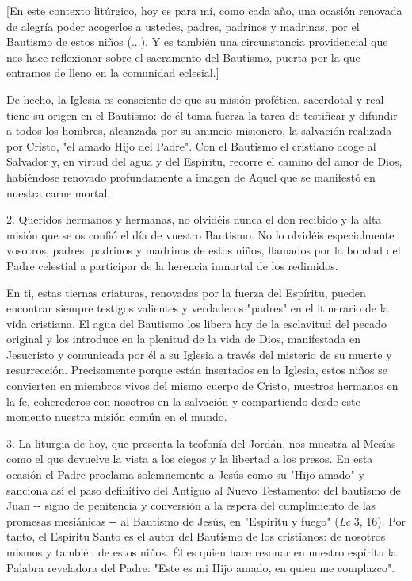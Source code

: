 \begin{body}
{[}En este contexto litúrgico, hoy es para mí, como cada año, una ocasión renovada de alegría poder acogerlos a ustedes, padres, padrinos y madrinas, por el Bautismo de estos niños (...). Y es también una circunstancia providencial que nos hace reflexionar sobre el sacramento del Bautismo, puerta por la que entramos de lleno en la comunidad eclesial.{]}

De hecho, la Iglesia es consciente de que su misión profética, sacerdotal y real tiene su origen en el Bautismo: de él toma fuerza la tarea de testificar y difundir a todos los hombres, alcanzada por su anuncio misionero, la salvación realizada por Cristo, "el amado Hijo del Padre". Con el Bautismo el cristiano acoge al Salvador y, en virtud del agua y del Espíritu, recorre el camino del amor de Dios, habiéndose renovado profundamente a imagen de Aquel que se manifestó en nuestra carne mortal.

2. Queridos hermanos y hermanas, no olvidéis nunca el don recibido y la alta misión que se os confió el día de vuestro Bautismo. No lo olvidéis especialmente vosotros, padres, padrinos y madrinas de estos niños, llamados por la bondad del Padre celestial a participar de la herencia inmortal de los redimidos.

En ti, estas tiernas criaturas, renovadas por la fuerza del Espíritu, pueden encontrar siempre testigos valientes y verdaderos "padres" en el itinerario de la vida cristiana. El agua del Bautismo los libera hoy de la esclavitud del pecado original y los introduce en la plenitud de la vida de Dios, manifestada en Jesucristo y comunicada por él a su Iglesia a través del misterio de su muerte y resurrección. Precisamente porque están insertados en la Iglesia, estos niños se convierten en miembros vivos del mismo cuerpo de Cristo, nuestros hermanos en la fe, coherederos con nosotros en la salvación y compartiendo desde este momento nuestra misión común en el mundo.

3. La liturgia de hoy, que presenta la teofonía del Jordán, nos muestra al Mesías como el que devuelve la vista a los ciegos y la libertad a los presos. En esta ocasión el Padre proclama solemnemente a Jesús como su "Hijo amado" y sanciona así el paso definitivo del Antiguo al Nuevo Testamento: del bautismo de Juan -\/- signo de penitencia y conversión a la espera del cumplimiento de las promesas mesiánicas -\/- al Bautismo de Jesús, en "Espíritu y fuego" (\emph{Lc} 3, 16). Por tanto, el Espíritu Santo es el autor del Bautismo de los cristianos: de nosotros mismos y también de estos niños. Él es quien hace resonar en nuestro espíritu la Palabra reveladora del Padre: "Este es mi Hijo amado, en quien me complazco".


\end{body}
